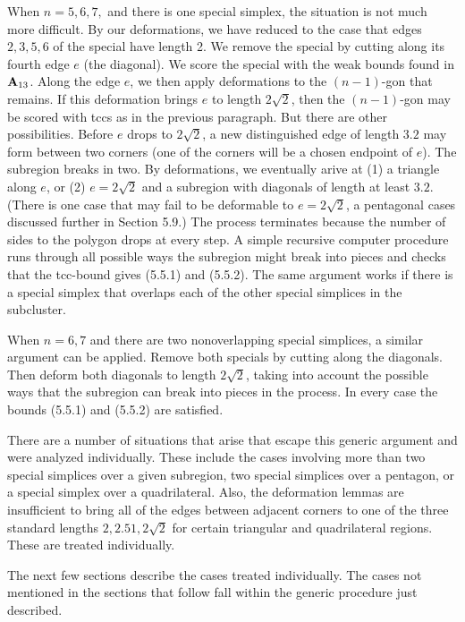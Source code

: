 When $n=5,6,7,$ and there is one special simplex, the situation is not
much more difficult.  By our deformations,  we have reduced to
the case that edges $2,3,5,6$ of the special have length 2.
We remove the special by cutting along
 its fourth edge $e$ (the diagonal).
  We score the special with the weak bounds found in
${\bold A}_{13}$.  Along the edge $e$, we then apply deformations to the
$(n-1)$-gon that remains.
If this deformation brings $e$ to
length $2\sqrt{2}$, then the $(n-1)$-gon may be scored
with tccs as in the previous paragraph.  But there are other possibilities.
Before $e$ drops to $2\sqrt{2}$, a new distinguished edge of length
$3.2$ may form between two corners (one of the corners will be a
chosen endpoint of $e$).  The subregion breaks in two.  
By deformations, we eventually arive at (1) a triangle along
$e$, or (2) $e=2\sqrt2$ and a subregion with diagonals
of length at least $3.2$.  (There is one case that
may fail to be deformable to $e=2\sqrt2$, a pentagonal
cases discussed further in Section 5.9.)
  The process terminates
because the number of sides to the polygon drops at every step.
A simple recursive computer procedure runs through all possible
ways the subregion might break into pieces and checks that the
tcc-bound gives (5.5.1) and (5.5.2).  The same argument works
if there is a special simplex that overlaps each of the other
special simplices in the subcluster.

When $n=6,7$ and there are two nonoverlapping special simplices, 
a similar argument
can be applied. 
 Remove both specials by cutting along the diagonals.
  Then deform both diagonals to length
$2\sqrt{2}$, taking into account the possible ways that the subregion
can break into pieces in the process.  In every case the bounds
(5.5.1) and (5.5.2)
are satisfied.

There are a number of situations that arise that escape this generic
argument and were analyzed individually.  
These include the cases involving
more than two special simplices over a given subregion, 
two special simplices over a pentagon, or a special simplex over a
quadrilateral.
  Also, the deformation lemmas
are insufficient to bring all of the edges between
adjacent corners to one of the three standard lengths $2,2.51,2\sqrt{2}$
for certain triangular and quadrilateral regions.  These are treated
individually.

The next few sections describe the cases treated individually.
  The cases not
mentioned in the sections that follow fall within the generic 
procedure just described.

